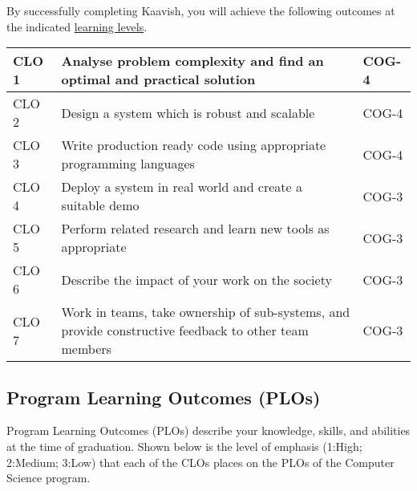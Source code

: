 \documentclass[a4paper]{article}
\newcommand{\new}[1]{{#1}}
\begin{document}
\new{By successfully completing Kaavish, you will achieve the following outcomes at the indicated} \href{https://educerecentre.com/what-are-the-three-domains-of-blooms-taxonomy/}{learning levels}.

\noindent
\begin{tabularx}{\textwidth}{|l|X|l|}
\hline
CLO 1 & Analyse problem complexity and find an optimal and practical solution & COG-4 \\\hline
CLO 2 & Design a system which is robust and scalable & COG-4\\\hline
CLO 3 & Write production ready code using appropriate programming languages & COG-4\\\hline
CLO 4 & Deploy a system in real world and create a suitable demo & COG-3\\\hline
CLO 5 & Perform related research and learn new tools as appropriate & COG-3\\\hline
CLO 6 & Describe the impact of your work on the society & COG-3\\\hline
CLO 7 & Work in teams, take ownership of sub-systems, and provide constructive feedback to other team members & COG-3\\\hline
\end{tabularx}

\subsection{Program Learning Outcomes (PLOs) }

\new{Program Learning Outcomes (PLOs) describe your knowledge, skills, and abilities at the time of graduation. Shown below is the level of emphasis (1:High; 2:Medium; 3:Low) that each of the CLOs places on the PLOs of the Computer Science program.}
\end{document}
